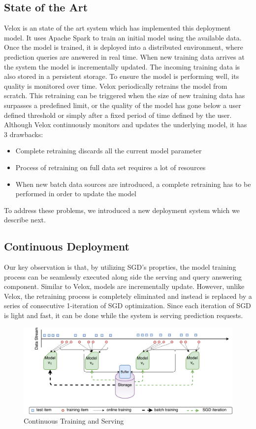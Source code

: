 \documentclass{vldb}
\begin{document}
\subsection{State of the Art} \label{sub:state-of-the-art}
Velox \cite{crankshaw2014missing} is an state of the art system which has implemented this deployment model.
It uses Apache Spark to train an initial model using the available data.
Once the model is trained, it is deployed into a distributed environment, where prediction queries are answered in real time.
When new training data arrives at the system the model is incrementally updated.
The incoming training data is also stored in a persistent storage.
To ensure the model is performing well, its quality is monitored over time.
Velox periodically retrains the model from scratch. 
This retraining can be triggered when the size of new training data has surpasses a predefined limit, or the quality of the model has gone below a user defined threshold or simply after a fixed period of time defined by the user.
Although Velox continuously monitors and updates the underlying model, it has 3 drawbacks:\\
\begin{itemize}
\item Complete retraining discards all the current model parameter
\item Process of retraining on full data set requires a lot of resources
\item When new batch data sources are introduced, a complete retraining has to be performed in order to update the model
\end{itemize}
To address these problems, we introduced a new deployment system which we describe next.

\subsection{Continuous Deployment}
Our key observation is that, by utilizing SGD's proprties, the model training process can be seamlessly executed along side the serving and query answering component.
Similar to Velox, models are incrementally update.
However, unlike Velox, the retraining process is completely eliminated and instead is replaced by a series of consecutive 1-iteration of SGD optimization.
Since each iteration of SGD is light and fast, it can be done while the system is serving prediction requests.
\begin{figure}[t]
\centering
\includegraphics[scale = 0.5]{../images/continuous-1.pdf}
\caption{Continuous Training and Serving}
\label{fig:cont-training-serving}
\end{figure}
\end{document}

